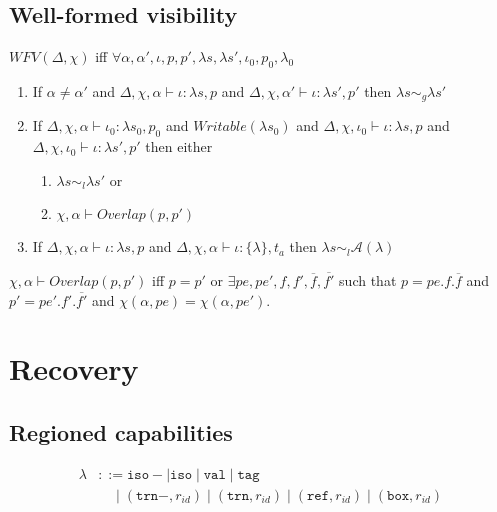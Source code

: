 \documentclass[format=acmsmall, authordraft, authorversion]{acmart}\settopmatter{printfolios=true,printccs=false,printacmref=false}
\newcommand{\seq}[1]{\overline{#1}}
\newcommand{\Alias}{\mathcal{A}}
\newcommand{\lambdas}{\lambda s}
\begin{document}
\subsection{Well-formed visibility}
\parbox{\textwidth}{
$\textit{WFV}(\Delta, \chi)$ iff $\forall \alpha, \alpha', \iota, p, p', \lambdas, \lambdas', \iota_0, p_0, \lambda_0$
\begin{enumerate}
    \item If $\alpha \neq \alpha'$
        and $\Delta, \chi, \alpha \vdash \iota : \lambdas, p$
        and $\Delta, \chi, \alpha' \vdash \iota : \lambdas', p'$
        then $\lambdas \sim_g \lambdas'$

    \item If $\Delta, \chi, \alpha \vdash \iota_0 : \lambdas_0, p_0$
        and $\textit{Writable}(\lambdas_0)$
        and $\Delta, \chi, \iota_0 \vdash \iota : \lambdas, p$
        and $\Delta, \chi, \iota_0 \vdash \iota : \lambdas', p'$
        then either
        \begin{enumerate}
            \item $\lambdas \sim_l \lambdas'$ or
            \item $\chi, \alpha \vdash \mathit{Overlap}(p, p')$
        \end{enumerate}

    \item If $\Delta, \chi, \alpha \vdash \iota : \lambdas, p$
        and $\Delta, \chi, \alpha \vdash \iota : \{ \lambda \}, t_a$
        then $\lambdas \sim_l \Alias(\lambda)$
\end{enumerate}
}

\parbox{\textwidth}{
$\chi, \alpha \vdash \mathit{Overlap}(p, p')$ iff $p=p'$ or $\exists pe, pe', f, f', \seq{f}, \seq{f'}$
such that $p = pe . f . \seq{f}$
and $p' = pe' . f' . \seq{f'}$
and $\chi(\alpha, pe) = \chi(\alpha, pe')$.
}

\section{Recovery}
\subsection{Regioned capabilities}
\begin{align*}
    \lambda &::= \texttt{iso}- \mid \texttt{iso} \mid \texttt{val} \mid \texttt{tag} \\
    &\quad \mid (\texttt{trn}-, r_{id}) \mid (\texttt{trn}, r_{id}) \mid (\texttt{ref}, r_{id}) \mid (\texttt{box}, r_{id}) 
\end{align*}
\end{document}
